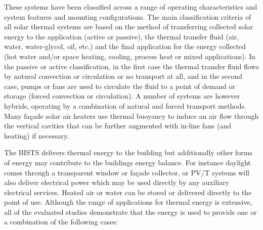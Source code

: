These systems have been classified across a range of operating characteristics and system features and mounting configurations. The main classification criteria of all solar thermal systems are based on the method of transferring collected solar energy to the application (active or passive), the thermal transfer fluid (air, water, water-glycol, oil, etc.) and the final application for the energy collected (hot water and/or space heating, cooling, process heat or mixed applications). In the passive or active classification, in the first case the thermal transfer fluid flows by natural convection or circulation or no transport at all, and in the second case, pumps or fans are used to circulate the fluid to a point of demand or storage (forced convection or circulation). A number of systems are however hybrids, operating by a combination of natural and forced transport methods. Many fa\c{c}ade solar air heaters use thermal buoyancy to induce an air flow through the vertical cavities that can be further augmented with in-line fans (and heating) if necessary.

The BISTS delivers thermal energy to the building but additionally other forms of energy may contribute to the buildings energy balance. For instance daylight comes through a transparent window or fa\c{c}ade collector, or PV/T systems will also deliver electrical power which may be used directly by any auxiliary electrical services. Heated air or water can be stored or delivered directly to the point of use. Although the range of applications for thermal energy is extensive, all of the evaluated studies demonstrate that the energy is used to provide one or a combination of the following cases:

